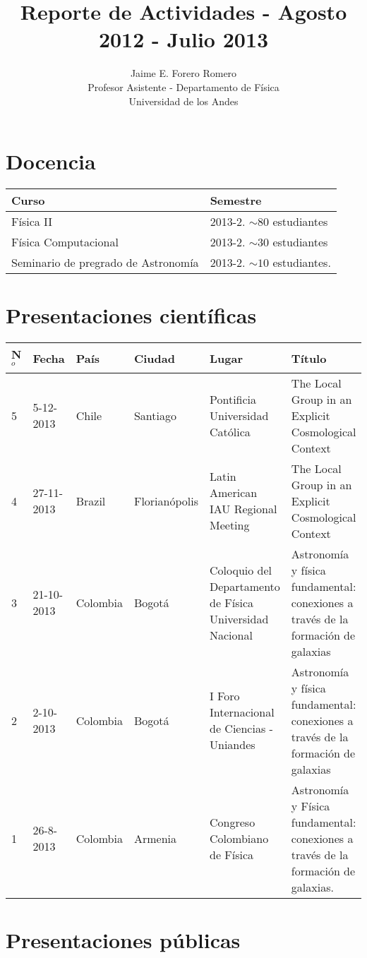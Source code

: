 \documentclass{article}
\title{Reporte de Actividades - Agosto 2012 - Julio 2013}
\author{Jaime E. Forero Romero\\Profesor Asistente - Departamento de
  F\'isica\\Universidad de los Andes}
\begin{document}
\maketitle

\section*{Docencia}

\begin{tabular}{p{7.0cm} p{5.0cm}}\hline
Curso & Semestre\\\hline
F\'isica II & 2013-2. $\sim 80$ estudiantes\\
F\'isica Computacional & 2013-2. $\sim 30$ estudiantes\\
Seminario de pregrado de Astronom\'ia & 2013-2. $\sim 10$ estudiantes.\\\hline
\end{tabular}

\section*{Presentaciones cient\'ificas}

\begin{tabular}{lp{2.0cm} p{1.2cm} p{1.8cm} p{2cm} p{5cm}}\hline
N$^{o}$ & Fecha & Pa\'is & Ciudad & Lugar & T\'itulo \\\hline
5 & 5-12-2013 & Chile & Santiago & Pontificia Universidad Cat\'olica & The Local Group in an Explicit Cosmological Context\\\hline
4 & 27-11-2013 & Brazil & Florian\'opolis & Latin American IAU Regional Meeting & The Local Group in an Explicit Cosmological Context\\\hline
3 & 21-10-2013 & Colombia & Bogot\'a & Coloquio del Departamento de F\'isica Universidad Nacional & Astronom\'ia y f\'isica fundamental: conexiones a trav\'es de la formaci\'on de galaxias\\\hline
2 & 2-10-2013 & Colombia & Bogot\'a & I Foro Internacional de Ciencias - Uniandes & Astronom\'ia y f\'isica fundamental: conexiones a trav\'es de la formaci\'on de galaxias\\\hline
1 & 26-8-2013 & Colombia & Armenia & Congreso Colombiano de F\'isica & Astronom\'ia y F\'isica fundamental: conexiones a trav\'es de la formaci\'on de galaxias.\\  \hline
\end{tabular}

\section*{Presentaciones p\'ublicas}
\end{document}
